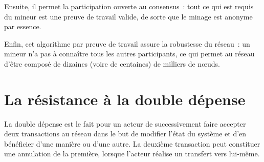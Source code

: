 Ensuite, il permet la participation ouverte au consensus~: tout ce qui est requis du mineur est une preuve de travail valide, de sorte que le minage est anonyme par essence.

Enfin, cet algorithme par preuve de travail assure la robustesse du réseau~: un mineur n'a pas à connaître tous les autres participants, ce qui permet au réseau d'être composé de dizaines (voire de centaines) de milliers de nœuds.

\section*{La résistance à la double dépense}

La double dépense est le fait pour un acteur de successivement faire accepter deux transactions au réseau dans le but de modifier l'état du système et d'en bénéficier d'une manière ou d'une autre. La deuxième transaction peut constituer une annulation de la première, lorsque l'acteur réalise un transfert vers lui-même.

